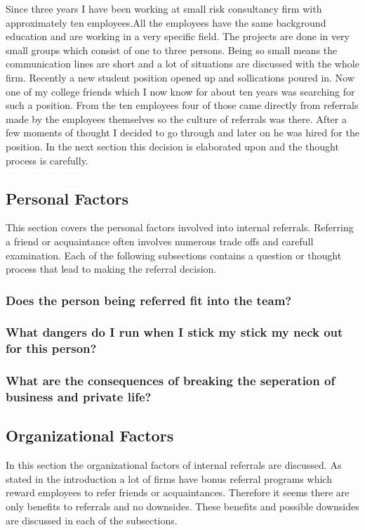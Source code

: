 \documentclass[a4paper, 11pt]{article} %
\begin{document}
 Since three years I have been working at small risk consultancy firm with approximately ten employees.All the employees have the same background education and are working in a very specific field. The projects are done in very small groups which consist of one to three persons. Being so small means the communication lines are short and a lot of situations are discussed with the whole firm. Recently a new student position opened up and sollications poured in.  Now one of my college friends which I now know for about ten years was searching for such a position. From the ten employees four of those came directly from referrals made by the employees themselves so the culture of referrals was there. After a few moments of thought I decided to go through and later on he was hired for the position. In the next section this decision is elaborated upon and the thought process is carefully. 

\subsection*{Personal Factors}

This section covers the personal factors involved into internal referrals. Referring a friend or acquaintance often involves numerous trade offs and carefull examination. Each of the following subsections contains a question or thought process that lead to making the referral decision.

\subsubsection*{Does the person being referred fit into the team?}
\subsubsection*{What dangers do I run when I stick my stick my neck out for this person?}
\subsubsection*{What are the consequences of breaking the seperation of business and private life?}

\subsection*{Organizational Factors}

In this section the organizational factors of internal referrals are discussed. As stated in the introduction a lot of firms have bonus referral programs which reward employees to refer friends or acquaintances. Therefore it seems there are only benefits to referrals and no downsides. These benefits and possible downsides are discussed in each of the subsections.
\end{document}
